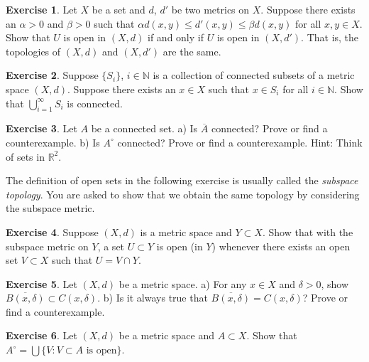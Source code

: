 \documentclass[12pt]{book}
\newcommand{\R}{{\mathbb{R}}}
\newcommand{\N}{{\mathbb{N}}}
\newcommand{\myindex}[1]{#1\index{#1}}
\theoremstyle{plain}
\theoremstyle{remark}
\theoremstyle{definition}
\newenvironment{exnote}{\small}{}
\theoremstyle{exercise}
\newtheorem{exercise}{Exercise}[section]
\theoremstyle{example}
\begin{document}
\begin{exercise}
Let $X$ be a set and $d$, $d'$ be two metrics on $X$.
Suppose there exists an $\alpha > 0$ and $\beta > 0$
such that $\alpha d(x,y) \leq d'(x,y) \leq \beta d(x,y)$ for all $x,y \in X$.
Show that $U$ is open in $(X,d)$ if and only if $U$ is open in $(X,d')$.
That is, the topologies of $(X,d)$ and $(X,d')$ are the same.
\end{exercise}


\begin{exercise}
Suppose $\{ S_i \}$, $i \in \N$
is a collection of connected subsets of a metric space $(X,d)$.  Suppose
there exists an $x \in X$ such that $x \in S_i$ for all $i \in \N$.
Show that $\bigcup_{i=1}^\infty S_i$ is connected.
\end{exercise}

\begin{exercise}
Let $A$ be a connected set.
a) \nolinebreak Is $\overline{A}$ connected?  Prove or find a counterexample.
b) \nolinebreak Is $A^\circ$ connected?  Prove or find a counterexample.
Hint: Think of sets in $\R^2$.
\end{exercise}

\begin{exnote}
The definition of open sets in the following exercise is usually called the
\emph{\myindex{subspace topology}}.  You are asked to show that
we obtain the same topology by considering the subspace metric.
\end{exnote}

\begin{exercise} \label{exercise:mssubspace}
Suppose $(X,d)$ is a metric space and $Y \subset X$.  Show that
with the subspace metric on $Y$, a set $U \subset Y$
is open (in $Y$) whenever there exists an open set $V \subset X$ such
that $U = V \cap Y$.
\end{exercise}

\begin{exercise}
Let $(X,d)$ be a metric space.
a) For any $x \in X$ and $\delta > 0$, show
$\overline{B(x,\delta)} \subset C(x,\delta)$.
b) Is it always true that
$\overline{B(x,\delta)} = C(x,\delta)$?  Prove or find a counterexample.
\end{exercise}

\begin{exercise}
Let $(X,d)$ be a metric space and $A \subset X$.  Show that
$A^\circ = \bigcup \{ V : V \subset A \text{ is open} \}$.
\end{exercise}
\end{document}
